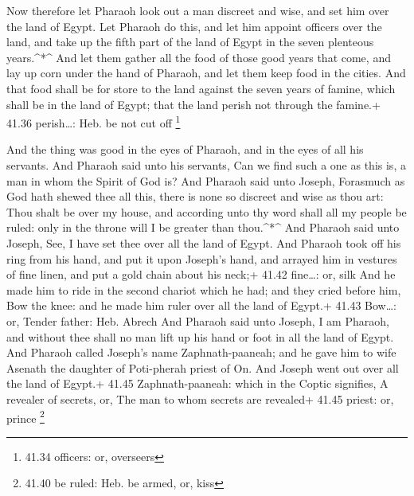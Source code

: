  Now therefore let Pharaoh look out a man discreet and
wise, and set him over the land of Egypt.  Let Pharaoh do
this, and let him appoint officers over the land, and take up the fifth
part of the land of Egypt in the seven plenteous years.\^{}*\^{}
 And let them gather all the food of those good years that
come, and lay up corn under the hand of Pharaoh, and let them keep food
in the cities.  And that food shall be for store to the
land against the seven years of famine, which shall be in the land of
Egypt; that the land perish not through the famine.+ 41.36 perish\ldots:
Heb. be not cut off \footnote{41.34 officers: or, overseers}

 And the thing was good in the eyes of Pharaoh, and in the
eyes of all his servants.  And Pharaoh said unto his
servants, Can we find such a one as this is, a man in whom the Spirit of
God is?  And Pharaoh said unto Joseph, Forasmuch as God
hath shewed thee all this, there is none so discreet and wise as thou
art:  Thou shalt be over my house, and according unto thy
word shall all my people be ruled: only in the throne will I be greater
than thou.\^{}*\^{}  And Pharaoh said unto Joseph, See, I
have set thee over all the land of Egypt.  And Pharaoh took
off his ring from his hand, and put it upon Joseph's hand, and arrayed
him in vestures of fine linen, and put a gold chain about his neck;+
41.42 fine\ldots: or, silk  And he made him to ride in the
second chariot which he had; and they cried before him, Bow the knee:
and he made him ruler over all the land of Egypt.+ 41.43 Bow\ldots: or,
Tender father: Heb. Abrech  And Pharaoh said unto Joseph, I
am Pharaoh, and without thee shall no man lift up his hand or foot in
all the land of Egypt.  And Pharaoh called Joseph's name
Zaphnath-paaneah; and he gave him to wife Asenath the daughter of
Poti-pherah priest of On. And Joseph went out over all the land of
Egypt.+ 41.45 Zaphnath-paaneah: which in the Coptic signifies, A
revealer of secrets, or, The man to whom secrets are revealed+ 41.45
priest: or, prince \footnote{41.40 be ruled: Heb. be armed, or, kiss}

